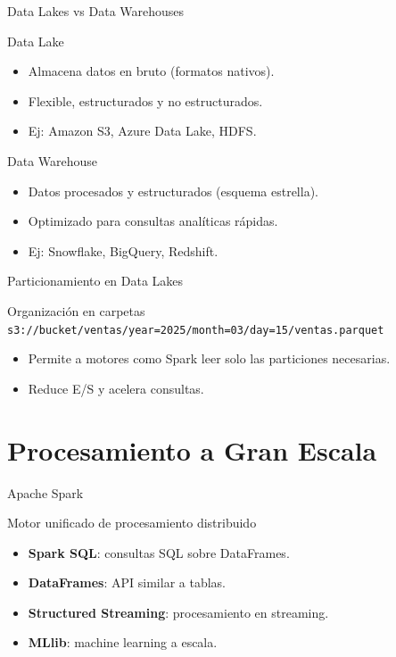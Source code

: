 \documentclass[aspectratio=169, 10pt, xcolor=table]{beamer}
\begin{document}
\begin{frame}{Data Lakes vs Data Warehouses}
    \begin{block}{Data Lake}
        \begin{itemize}
            \item Almacena datos en bruto (formatos nativos).
            \item Flexible, estructurados y no estructurados.
            \item Ej: Amazon S3, Azure Data Lake, HDFS.
        \end{itemize}
    \end{block}
    \begin{block}{Data Warehouse}
        \begin{itemize}
            \item Datos procesados y estructurados (esquema estrella).
            \item Optimizado para consultas analíticas rápidas.
            \item Ej: Snowflake, BigQuery, Redshift.
        \end{itemize}
    \end{block}
\end{frame}

\begin{frame}{Particionamiento en Data Lakes}
    \begin{block}{Organización en carpetas}
        \texttt{s3://bucket/ventas/year=2025/month=03/day=15/ventas.parquet}
    \end{block}
    \begin{itemize}
        \item Permite a motores como Spark leer solo las particiones necesarias.
        \item Reduce E/S y acelera consultas.
    \end{itemize}
\end{frame}

\section{Procesamiento a Gran Escala}

\begin{frame}{Apache Spark}
    \begin{block}{Motor unificado de procesamiento distribuido}
        \begin{itemize}
            \item \textbf{Spark SQL}: consultas SQL sobre DataFrames.
            \item \textbf{DataFrames}: API similar a tablas.
            \item \textbf{Structured Streaming}: procesamiento en streaming.
            \item \textbf{MLlib}: machine learning a escala.
        \end{itemize}
    \end{block}
\end{frame}
\end{document}
